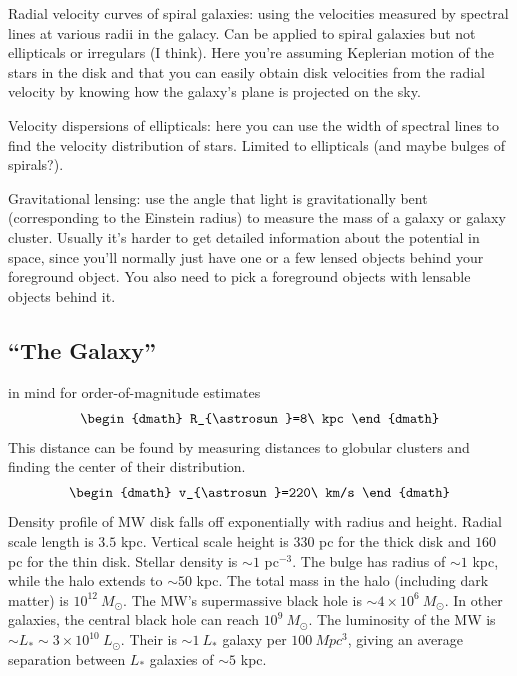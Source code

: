 \begin{enumerate}
      Radial velocity curves of spiral galaxies: using the velocities measured by spectral lines at various radii in the galacy. Can be applied to spiral galaxies but not ellipticals or irregulars (I think). Here you're assuming Keplerian motion of the stars in the disk and that you can easily obtain disk velocities from the radial velocity by knowing how the galaxy's plane is projected on the sky.
      
      Velocity dispersions of ellipticals: here you can use the width of spectral lines to find the velocity distribution of stars. Limited to ellipticals (and maybe bulges of spirals?).
      
      Gravitational lensing: use the angle that light is gravitationally bent (corresponding to the Einstein radius) to measure the mass of a galaxy or galaxy cluster. Usually it's harder to get detailed information about the potential in space, since you'll normally just have one or a few lensed objects behind your foreground object. You also need to pick a foreground objects with lensable objects behind it.
      
\end{enumerate}

\subsection{``The Galaxy''}
 in mind for order-of-magnitude estimates
\begin{dgroup}
\begin{dmath}
R_{\astrosun}=8\ kpc
\end{dmath}
\end{dgroup}
This distance can be found by measuring distances to globular clusters and 
finding the center of their distribution.
\begin{dgroup}
\begin{dmath}
v_{\astrosun}=220\ km/s
\end{dmath}
\end{dgroup}
Density profile of MW disk falls off exponentially with radius and height.  
Radial scale length is $3.5$ kpc.  Vertical scale height is $330$ pc for the 
thick disk and $160$ pc for the thin disk.  Stellar density is $\sim1$ 
pc$^{-3}$.  The bulge has radius of $\sim1$ kpc, while the halo extends to 
$\sim50$ kpc.  The total mass in the halo (including dark matter) is 
$10^{12}\ M_{\odot}$.  The MW's supermassive black hole is 
$\sim4\times10^6\ M_{\odot}$.  In other galaxies, the central black hole can 
reach $10^9\ M_{\odot}$.  The luminosity of the MW is 
$\sim L_*\sim3\times10^{10}\ L_{\odot}$.  Their is $\sim1\ L_*$ galaxy per 
$100\ Mpc^3$, giving an average separation between $L_*$ galaxies of 
$\sim5$ kpc.  

